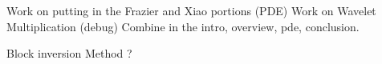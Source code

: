 Work on putting in the Frazier and Xiao portions (PDE)
Work on Wavelet Multiplication (debug)
Combine in the intro, overview, pde, conclusion.  

Block inversion Method ?   
